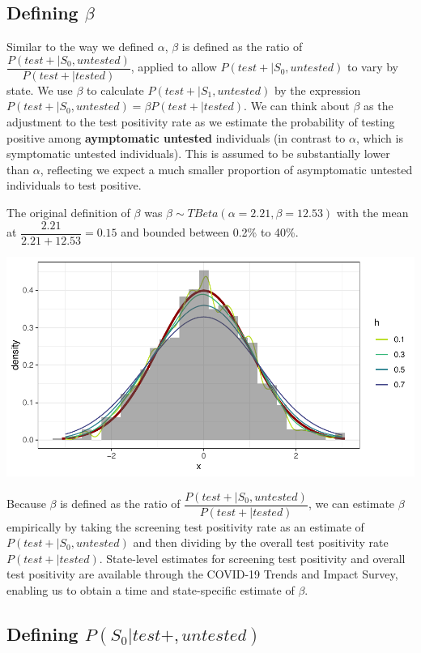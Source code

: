 \documentclass[12pt,twoside]{smiththesis}
\begin{document}
\hypertarget{defining-beta}{%
\subsection{\texorpdfstring{Defining \(\beta\)}{Defining \textbackslash beta}}\label{defining-beta}}

Similar to the way we defined \(\alpha\), \(\beta\) is defined as the ratio of \(\dfrac{P(test + |S_0, untested)}{P(test+|tested)}\), applied to allow \(P(test + |S_0, untested)\) to vary by state. We use \(\beta\) to calculate \(P(test+|S_1, untested)\) by the expression \(P(test+|S_0, untested) =\beta P(test+|tested)\). We can think about \(\beta\) as the adjustment to the test positivity rate as we estimate the probability of testing positive among \textbf{aymptomatic untested} individuals (in contrast to \(\alpha\), which is symptomatic untested individuals). This is assumed to be substantially lower than \(\alpha\), reflecting we expect a much smaller proportion of asymptomatic untested individuals to test positive.

The original definition of \(\beta\) was
\(\beta \sim TBeta(\alpha = 2.21, \beta = 12.53)\) with the mean at \(\dfrac{2.21}{2.21 + 12.53} = 0.15\) and bounded between 0.2\% to 40\%.

\includegraphics[width=0.5\linewidth]{thesis_files/figure-latex/unnamed-chunk-36-1}

Because \(\beta\) is defined as the ratio of \(\dfrac{P(test + |S_0, untested)}{P(test+|tested)}\), we can estimate \(\beta\) empirically by taking the screening test positivity rate as an estimate of \(P(test + |S_0, untested)\) and then dividing by the overall test positivity rate \(P(test+|tested)\). State-level estimates for screening test positivity and overall test positivity are available through the COVID-19 Trends and Impact Survey, enabling us to obtain a time and state-specific estimate of \(\beta\).

\hypertarget{defining-ps_0testuntested}{%
\subsection{\texorpdfstring{Defining \(P(S_0|test+,untested)\)}{Defining P(S\_0\textbar test+,untested)}}\label{defining-ps_0testuntested}}
\end{document}
